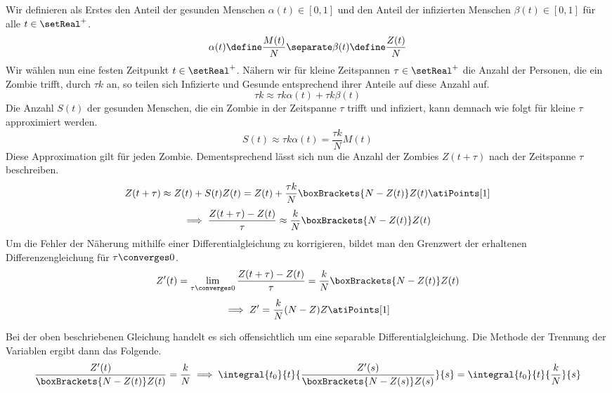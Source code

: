 \begin{atiSolution}
	\begin{atiSubtaskSolutions}
		\item[\localref{a}]{
			Wir definieren als Erstes den Anteil der gesunden Menschen $\alpha(t)\in[0,1]$ und den Anteil der infizierten Menschen $\beta(t)\in[0,1]$ für alle $t\in\setReal^+$.
			\[
				\alpha(t)\define \frac{M(t)}{N}\separate\beta(t)\define\frac{Z(t)}{N}
			\]
			Wir wählen nun eine festen Zeitpunkt $t\in\setReal^+$.
			Nähern wir für kleine Zeitspannen $\tau\in\setReal^+$ die Anzahl der Personen, die ein Zombie trifft, durch $\tau k$ an, so teilen sich Infizierte und Gesunde entsprechend ihrer Anteile auf diese Anzahl auf.
			\[
				\tau k \approx \tau k\alpha(t) + \tau k\beta(t)
			\]
			Die Anzahl $S(t)$ der gesunden Menschen, die ein Zombie in der Zeitspanne $\tau$ trifft und infiziert, kann demnach wie folgt für kleine $\tau$ approximiert werden.
			\[
				S(t) \approx \tau k \alpha(t) = \frac{\tau k}{N} M(t)
			\]
			Diese Approximation gilt für jeden Zombie.
			Dementsprechend lässt sich nun die Anzahl der Zombies $Z(t+\tau)$ nach der Zeitspanne $\tau$ beschreiben.
			\[
				Z(t+\tau) \approx Z(t) + S(t)Z(t) = Z(t) + \frac{\tau k}{N} \boxBrackets{N-Z(t)}Z(t)\atiPoints[1]
			\]
			\[
				\implies \frac{Z(t+\tau)-Z(t)}{\tau} \approx \frac{k}{N}\boxBrackets{N-Z(t)}Z(t)
			\]
			Um die Fehler der Näherung mithilfe einer Differentialgleichung zu korrigieren, bildet man den Grenzwert der erhaltenen Differenzengleichung für $\tau\converges 0$.
			\[
				Z'(t) = \lim_{\tau\converges 0}\frac{Z(t+\tau)-Z(t)}{\tau} = \frac{k}{N}\boxBrackets{N-Z(t)}Z(t)
			\]
			\[
				\implies Z' = \frac{k}{N}(N-Z)Z \atiPoints[1]
			\]
		}
		\item[\localref{b}]{
			Bei der oben beschriebenen Gleichung handelt es sich offensichtlich um eine separable Differentialgleichung.
			Die Methode der Trennung der Variablen ergibt dann das Folgende.
			\[
				\frac{Z'(t)}{\boxBrackets{N-Z(t)}Z(t)} = \frac{k}{N} \implies \integral{t_0}{t}{\frac{Z'(s)}{\boxBrackets{N-Z(s)}Z(s)}}{s} = \integral{t_0}{t}{\frac{k}{N}}{s}
\]}
\end{atiSubtaskSolutions}
\end{atiSolution}
